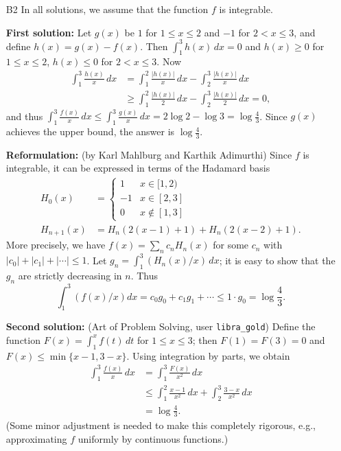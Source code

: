 \documentclass[amssymb,twocolumn,pra,10pt,aps]{revtex4-1}
\begin{document}
\begin{itemize}
\item[B2]
In all solutions, we assume that the function $f$ is integrable.

\textbf{First solution:}
Let $g(x)$ be $1$ for $1\leq x\leq 2$ and $-1$ for $2<x\leq 3$, and 
define $h(x)=g(x)-f(x)$. Then $\int_1^3 h(x)\,dx = 0$ and $h(x) \geq 0$ 
for $1\leq x\leq 2$, $h(x) \leq 0$ for $2<x\leq 3$. Now
\begin{align*}
\int_1^3 \frac{h(x)}{x}\,dx & = \int_1^2 \frac{|h(x)|}{x}\,dx - \int_2^3 
\frac{|h(x)|}{x}\,dx\\
&\geq \int_1^2 \frac{|h(x)|}{2}\,dx - \int_2^3 \frac{|h(x)|}{2}\,dx = 0,
\end{align*}
and thus $\int_1^3 \frac{f(x)}{x}\,dx \leq \int_1^3 \frac{g(x)}{x}\,dx = 
2\log 2-\log 3 = \log \frac{4}{3}$. Since $g(x)$ achieves the upper bound, the answer is 
$\log \frac{4}{3}$.

\noindent
\textbf{Reformulation:}
(by Karl Mahlburg and Karthik Adimurthi) 
Since $f$ is integrable, it can be expressed in terms of the Hadamard basis
\begin{align*}
H_0(x) &= \begin{cases} 1 & x \in [1,2) \\
-1 & x \in [2,3] \\
0 & x \notin [1,3] \end{cases} \\
H_{n+1}(x) &= H_n( 2(x-1) + 1) + H_n( 2(x-2) + 1).
\end{align*}
More precisely, we have $f(x) = \sum_n c_n H_n(x)$ for some $c_n$ 
with $|c_0| + |c_1| + |\cdots| \leq 1$. Let $g_n = \int_1^3 (H_n(x) / x)\,dx$; 
it is easy to show that the $g_n$ are strictly decreasing in $n$. 
Thus \[
\int_1^3 (f(x) / x) dx = c_0 g_0 +
c_1 g_1 + \cdots \leq 1 \cdot g_0 = \log \frac{4}{3}.
\] 

\noindent
\textbf{Second solution:}
(Art of Problem Solving, user \verb+libra_gold+)
Define the function $F(x) = \int_1^x f(t)\,dt$ for $1 \leq x \leq 3$; then $F(1) = F(3) = 0$ and $F(x) \leq \min\{x-1,3-x\}$. Using integration by parts, we obtain
\begin{align*}
\int_1^3 \frac{f(x)}{x}\,dx &= \int_1^3 \frac{F(x)}{x^2}\,dx \\
&\leq \int_1^2 \frac{x-1}{x^2}\,dx + \int_2^3 \frac{3-x}{x^2}\,dx \\
&= \log \frac{4}{3}.
\end{align*}
(Some minor adjustment is needed to make this completely rigorous, e.g., approximating $f$ uniformly by continuous functions.)


\end{itemize}
\end{document}
